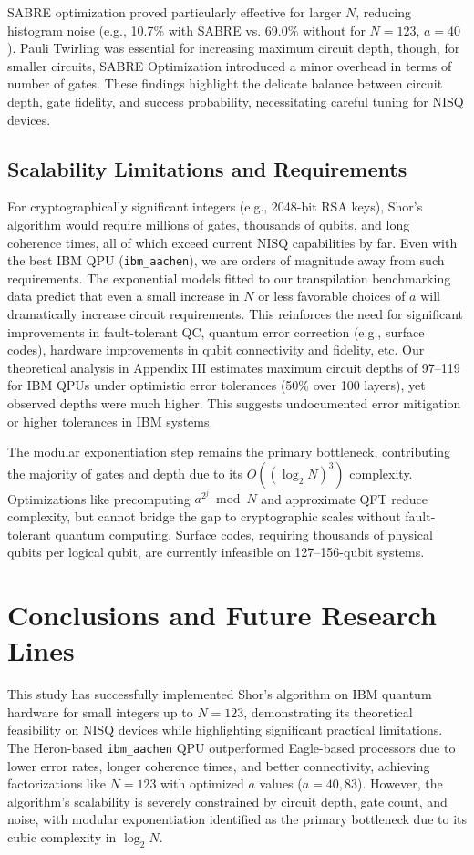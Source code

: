 \documentclass[conference,twoside]{IEEEtran}
\begin{document}
SABRE optimization proved particularly effective for larger $N$, reducing histogram noise (e.g., 10.7\% with SABRE vs. 69.0\% without for $N=123$, $a=40$). Pauli Twirling was essential for increasing maximum circuit depth, though,  for smaller circuits, SABRE Optimization introduced a minor overhead in terms of number of gates. These findings highlight the delicate balance between circuit depth, gate fidelity, and success probability, necessitating careful tuning for NISQ devices.

\subsection{Scalability Limitations and Requirements}

 For cryptographically significant integers (e.g., 2048-bit RSA keys), Shor’s algorithm would require millions of gates, thousands of qubits, and long coherence times, all of which exceed current NISQ capabilities by far. Even with the best IBM QPU (\texttt{ibm\_aachen}), we are orders of magnitude away from such requirements. The exponential models fitted to our transpilation benchmarking data predict that even a small increase in $N$ or less favorable choices of $a$ will dramatically increase circuit requirements. This reinforces the need for significant improvements in fault-tolerant QC, quantum error correction (e.g., surface codes), hardware improvements in qubit connectivity and fidelity, etc. Our theoretical analysis in Appendix III estimates maximum circuit depths of 97--119 for IBM QPUs under optimistic error tolerances (50\% over 100 layers), yet observed depths were much higher. This suggests undocumented error mitigation or higher tolerances in IBM systems.

The modular exponentiation step remains the primary bottleneck, contributing the majority of gates and depth due to its $O((\log_2 N)^3)$ complexity. Optimizations like precomputing $a^{2^j} \bmod N$ and approximate QFT reduce complexity, but cannot bridge the gap to cryptographic scales without fault-tolerant quantum computing. Surface codes, requiring thousands of physical qubits per logical qubit, are currently infeasible on 127--156-qubit systems.

\section{Conclusions and Future Research Lines}

This study has successfully implemented Shor's algorithm on IBM quantum hardware for small integers up to $N=123$, demonstrating its theoretical feasibility on NISQ devices while highlighting significant practical limitations. The Heron-based \texttt{ibm\_aachen} QPU outperformed Eagle-based processors due to lower error rates, longer coherence times, and better connectivity, achieving factorizations like $N=123$ with optimized $a$ values ($a=40, 83$). However, the algorithm's scalability is severely constrained by circuit depth, gate count, and noise, with modular exponentiation identified as the primary bottleneck due to its cubic complexity in $\log_2 N$.
\end{document}
